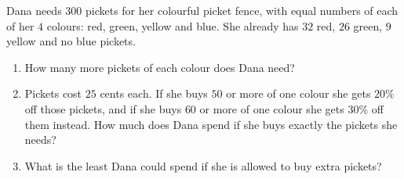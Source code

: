 Dana needs $300$ pickets for her colourful picket fence, with equal numbers of each of her $4$ colours: red, green, yellow and blue. She already has $32$ red, $26$ green, $9$ yellow and no blue pickets.
\begin{enumerate}
\item[(a)] How many more pickets of each colour does Dana need?
\item[(b)] Pickets cost $25$ cents each. If she buys $50$ or more of one colour she gets $20\%$ off those pickets, and if she buys $60$ or more of one colour she gets $30\%$ off them instead. How much does Dana spend if she buys exactly the pickets she needs?
\item[(c)] What is the least Dana could spend if she is allowed to buy extra pickets?
\end{enumerate}
